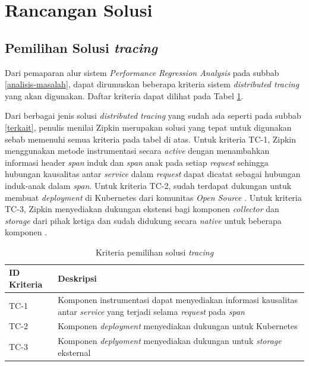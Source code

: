 \section{Rancangan Solusi}

\subsection{Pemilihan Solusi \textit{tracing}}

Dari pemaparan alur sistem \textit{Performance Regression Analysis} pada subbab \ref{analisis-masalah}, dapat dirumuskan beberapa kriteria sistem \textit{distributed tracing} yang akan digunakan. Daftar kriteria dapat dilihat pada Tabel \ref{ch3-trace-crit}.

Dari berbagai jenis solusi \textit{distributed tracing} yang sudah ada seperti pada subbab \ref{terkait}, penulis menilai Zipkin merupakan solusi yang tepat untuk digunakan sebab memenuhi semua kriteria pada tabel di atas. Untuk kriteria TC-1, Zipkin menggunakan metode instrumentasi secara \textit{active} dengan menambahkan informasi header \textit{span} induk dan \textit{span} anak pada setiap \textit{request} sehingga hubungan kausalitas antar \textit{service} dalam \textit{request} dapat dicatat sebagai hubungan induk-anak dalam \textit{span}. Untuk kriteria TC-2, sudah terdapat dukungan untuk membuat \textit{deployment} di Kubernetes dari komunitas \textit{Open Source} \citep{zipkin-ambassador}. Untuk kriteria TC-3, Zipkin menyediakan dukungan ekstensi bagi komponen \textit{collector} dan \textit{storage} dari pihak ketiga dan sudah didukung secara \textit{native} untuk beberapa komponen \citep{zipkin-storage}.

\begin{small}
	\begin{longtable}{ | p{3cm} | p{10cm} |}
		\caption{Kriteria pemilihan solusi \textit{tracing}}
		\label{ch3-trace-crit}                                                           
		\\ \hline
		\centering\bfseries{ID Kriteria} & \centering\bfseries{Deskripsi} \tabularnewline \hline
		\endfirsthead
		TC-1 & Komponen instrumentasi dapat menyediakan informasi kausalitas antar \textit{service} yang terjadi selama \textit{request} pada \textit{span} \\ \hline
		TC-2 & Komponen \textit{deployment} menyediakan dukungan untuk Kubernetes \\ \hline
		TC-3 & Komponen \textit{deplyoment} menyediakan dukungan untuk \textit{storage} eksternal \\ \hline
	\end{longtable}
\end{small}

